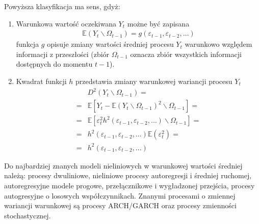 Powyższa klasyfikacja ma sens, gdyż:
\begin{enumerate}
\item Warunkowa wartość oczekiwana $ Y_t $ możne być zapisana
\begin{gather*}
\mathbb E \left(Y_t\backslash\Omega_{t-1}\right)=g\left (\varepsilon_{t-1},\varepsilon_{t-2},\dots \right)
\end{gather*}
funkcja $ g $ opisuje zmiany wartości średniej procesu $ Y_t $ warunkowo względem informacji z przeszłości (zbiór $ \Omega_{t-1} $ oznacza zbiór wszystkich informacji dostępnych do momentu $ t-1 $).
\item Kwadrat funkcji $ h $ przedstawia zmiany warunkowej wariancji procesu $ Y_t $
\begin{align*}
&D^2\left(Y_t\backslash\Omega_{t-1}\right)
=\\=&
\mathbb E \left[Y_t-\mathbb E \left(Y_t\backslash\Omega_{t-1}\right)^2\backslash\Omega_{t-1}\right]
=\\=&
\mathbb E \left[\varepsilon_t^2 h^2\left (\varepsilon_{t-1},\varepsilon_{t-2},\dots \right)\backslash\Omega_{t-1}\right]
=\\=&
h^2\left (\varepsilon_{t-1},\varepsilon_{t-2},\dots \right)\mathbb E \left(\varepsilon_t^2 \right)
=\\=&
h^2\left (\varepsilon_{t-1},\varepsilon_{t-2},\dots \right)
\end{align*}
\end{enumerate}
Do najbardziej znanych modeli nieliniowych w warunkowej wartości średniej należą: procesy dwuliniowe, nieliniowe procesy autoregresji i średniej ruchomej, autoregresyjne modele progowe, przełącznikowe i wygładzonej przejścia, procesy autogresyjne o losowych współczynnikach. Znanymi procesami o zmiennej wariancji warunkowej są procesy ARCH/GARCH oraz procesy zmienności stochastycznej.

